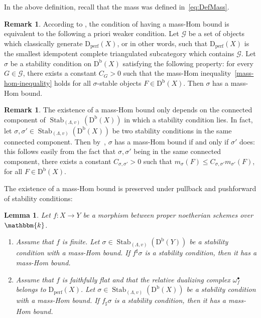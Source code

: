 \documentclass[11pt, reqno]{amsart}
\numberwithin{equation}{section}
\theoremstyle{plain}
\newtheorem{lemma}[theorem]{Lemma}
\theoremstyle{remark}
\theoremstyle{definition}
\newtheorem{remark}[theorem]{Remark}
\theoremstyle{italicsname}
\newcommand{\Db}{\mathrm{D^b}}
\newcommand{\Dperf}{\mathrm{D}_{\mathrm{perf}}}
\DeclareMathOperator{\Stab}{Stab}
\newcommand{\cG}{\mathcal{G}}
\newcommand{\KK}{\mathbbm{k}}
\begin{document}
In the above definition, recall that the mass was defined in~\eqref{eq:DefMass}.


\begin{remark}\label{remark-mass-hom-criterion}
According to \cite[Lemma 2.8]{DHL-robotis}, the condition of having a mass-Hom bound is equivalent to the following a priori weaker condition. 
Let $\cG$ be a set of objects which classically generate $\Dperf(X)$, or in other words, such that $\Dperf(X)$ is the smallest idempotent complete triangulated subcategory which contains $\cG$. 
Let $\sigma$ be a stability condition on $\Db(X)$ satisfying the following property: for every $G \in \cG$, there exists a constant $C_G>0$ such that the mass-Hom inequality~\eqref{mass-hom-inequality} holds for all $\sigma$-stable objects $F\in\Db(X)$.  
Then $\sigma$ has a mass-Hom bound.
\end{remark}

\begin{remark}\label{remark-mass-hom-connected}
The existence of a mass-Hom bound only depends on the connected component of $\Stab_{(\Lambda, v)}(\Db(X))$ in which a stability condition lies.
In fact, let $\sigma,\sigma'\in\Stab_{(\Lambda, v)}(\Db(X))$ be two stability conditions in the same connected component. 
Then by~\cite[Corollary~2.14]{DHL-robotis}, $\sigma$ has a mass-Hom bound if and only if $\sigma'$ does: this follows easily from the fact that $\sigma,\sigma'$ being in the same connected component, there exists a constant $C_{\sigma,\sigma'}>0$ such that $m_{\sigma}(F)\leq C_{\sigma,\sigma'} m_{\sigma'}(F)$, for all $F\in\Db(X)$.
\end{remark}

The existence of a mass-Hom bound is preserved under pullback and pushforward of stability conditions:

\begin{lemma}\label{lemma-pullback-mass-hom-bound}
Let $f \colon X \to Y$ be a morphism between proper noetherian schemes over $\KK$.
\begin{enumerate}[{\rm (1)}]
\item\label{enum:MassPullback} Assume that $f$ is finite. Let $\sigma\in\Stab_{(\Lambda,v)}(\Db(Y))$ be a stability condition with a mass-Hom bound. If $f^\sharp\sigma$ is a stability condition, then it has a mass-Hom bound. 

\item\label{enum:MassPushforward} Assume that $f$ is faithfully flat and that the relative dualizing complex $\omega_f^\bullet$ belongs to $\Dperf(X)$. Let $\sigma\in\Stab_{(\Lambda,v)}(\Db(X))$ be a stability condition with a mass-Hom bound. If $f_\sharp\sigma$ is a stability condition, then it has a mass-Hom bound.
\end{enumerate}
\end{lemma}
\end{document}
